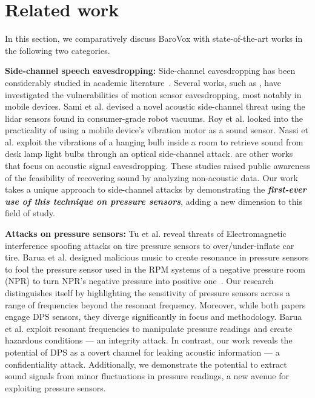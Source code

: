 \section{Related work}
In this section, we comparatively discuss BaroVox with state-of-the-art works in the following two categories. 


{\textbf{Side-channel speech eavesdropping:}} Side-channel eavesdropping has been considerably studied in academic literature~\cite{michalevsky2014gyrophone, zhang2015accelword, anand2018speechless, anand2021spearphone, han2017pitchln, 7878599, marquardt2011sp,9517289, 9095984, cpams}. Several works, such as \cite{michalevsky2014gyrophone, zhang2015accelword, anand2018speechless, anand2021spearphone, han2017pitchln, marquardt2011sp, ba2020learning, wang2022mmphone, gao2022device, gao2022kite}, have investigated the vulnerabilities of motion sensor eavesdropping, most notably in mobile devices.
Sami et al. \cite{sami2020spying} devised a novel acoustic side-channel threat using the lidar sensors found in consumer-grade robot vacuums. 
Roy et al. \cite{roy2016listening} looked into the practicality of using a mobile device's vibration motor as a sound sensor. Nassi et al. \cite{nassi2022lamphone} exploit the vibrations of a hanging bulb inside a room to retrieve sound from desk lamp light bulbs through an optical side-channel attack. 
\cite{kwong2019hard,long2023side,nassi2021glowworm,nassi2023little,nassi2022little,wang2022wavesdropper,basak2022mmspy} are other works that focus on acoustic signal eavesdropping. 
These studies raised public awareness of the feasibility of recovering sound by analyzing non-acoustic data. Our work takes a unique approach to side-channel attacks by demonstrating the \textit{\textbf{first-ever use of this technique on pressure sensors}}, adding a new dimension to this field of study. 

\textbf{Attacks on pressure sensors:}
Tu et al. \cite{tu2021transduction} reveal threats of Electromagnetic interference spoofing attacks on tire pressure sensors to over/under-inflate car tire.
Barua et al. designed malicious music to create resonance in pressure sensors to fool the pressure sensor used in the RPM systems of a negative pressure room (NPR) to turn NPR's negative pressure into positive one~\cite{barua2022wolf}.   Our research distinguishes itself by highlighting the sensitivity of pressure sensors across a range of frequencies beyond the resonant frequency. Moreover, while both papers engage DPS sensors, they diverge significantly in focus and methodology. 
Barua et al. exploit resonant frequencies to manipulate pressure readings and create hazardous conditions --- an integrity attack. In contrast, our work reveals the potential of DPS as a covert channel for leaking acoustic information 
 --- a confidentiality attack. Additionally, we demonstrate the potential to extract sound signals from minor fluctuations in pressure readings, a new avenue for exploiting pressure sensors.

